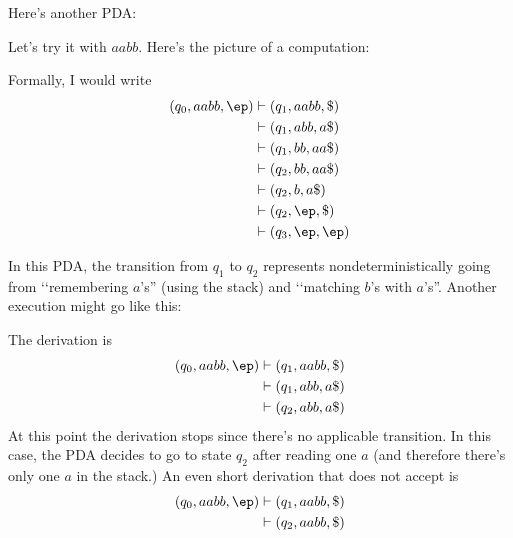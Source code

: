 \newpage
Here's another PDA:
\begin{center}
\end{center}

Let's try it with $aabb$.
Here's the picture of a computation:



Formally, I would write
\begin{align*}
  (q_0, aabb, \ep)
  &\vdash (q_1, aabb, \$) \\
  &\vdash (q_1, abb, a\$) \\
  &\vdash (q_1, bb, aa\$) \\
  &\vdash (q_2, bb, aa\$) \\
  &\vdash (q_2, b, a\$) \\
  &\vdash (q_2, \ep, \$) \\
  &\vdash (q_3, \ep, \ep) 
\end{align*}

In this PDA, the transition from $q_1$ to $q_2$ represents
nondeterministically going from \lq\lq remembering $a$'s'' (using the stack)
and \lq\lq matching $b$'s with $a$'s''.
Another execution might go like this:



The derivation is
\begin{align*}
  (q_0, aabb, \ep)
  &\vdash (q_1, aabb, \$) \\
  &\vdash (q_1, abb, a\$) \\
  &\vdash (q_2, abb, a\$)
\end{align*}
At this point the derivation stops since there's no applicable
transition.
In this case, the PDA decides to go to state $q_2$ after reading one $a$
(and therefore there's only one $a$ in the stack.)
An even short derivation that does not accept is
\begin{align*}
  (q_0, aabb, \ep)
  &\vdash (q_1, aabb, \$) \\
  &\vdash (q_2, aabb, \$)
\end{align*}

